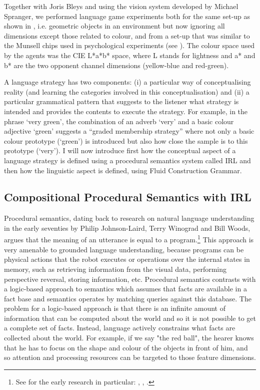 Together with Joris Bleys and using the vision system developed by Michael Spranger, we 
performed language game experiments both for the same set-up as shown in , 
i.e. geometric objects in an environment but now ignoring all dimensions except those related to colour, 
and from a set-up that was similar to the Munsell chips used
in psychological experiments (see ). The colour space used by the agents was the CIE L*a*b* space, where 
L stands for lightness and a* and b* are the two opponent channel dimensions (yellow-blue and red-green). 

A language strategy has two components: (i) a particular way of conceptualising reality (and learning the categories involved
in this conceptualisation) and (ii) a particular grammatical pattern that suggests to the listener what strategy is intended 
and provides the contents to execute the strategy. For example, in the phrase `very green', the combination of an adverb 
`very' and a basic colour adjective `green' suggests a ``graded membership strategy'' where not only a basic colour prototype
(`green') is introduced but also how close the sample is to this prototype (`very'). I will now introduce first how 
the conceptual aspect of a language strategy is defined using a procedural semantics system called IRL and then how the 
linguistic aspect is defined, using Fluid Construction Grammar. 

\subsection{Compositional Procedural Semantics with IRL}

Procedural semantics, dating back to research on natural language understanding in the 
early seventies by Philip Johnson-Laird, Terry Winograd and Bill Woods, argues that the meaning of an utterance is 
equal to a program.\footnote{See for the early research in particular: \cite{Winograd:1971}, \cite{Woods:1981}, 
\cite{Johnson-Laird:1977}.} 
This approach is very amenable to grounded language understanding, because programs can be physical 
actions that the robot executes or operations over the internal states in memory, such as retrieving information
from the visual data, performing perspective reversal, storing information, etc. Procedural semantics
contrasts with a logic-based approach to semantics which assumes that facts are available in a fact base and semantics operates
by matching queries against this database. The problem for a logic-based approach
is that there is an infinite amount of
information that can be computed about the world and so it is not possible to get a 
complete set of facts. Instead, language actively constrains what facts are collected about the world. For example, if 
we say "the red ball", the hearer knows that he has to focus on the shape and colour of the objects in front of him, 
and so attention and processing resources can be targeted to those feature dimensions. 

